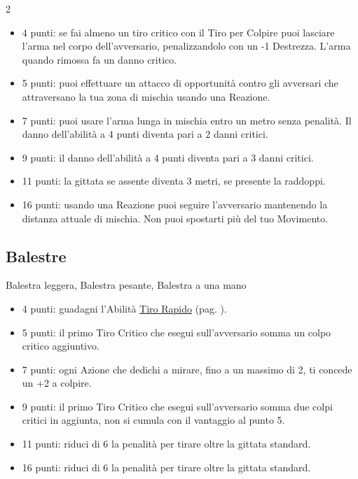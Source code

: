 \begin{multicols}{2}
\begin{itemize}[leftmargin=*]
\item 4 punti: se fai almeno un tiro critico con il Tiro per Colpire puoi lasciare l'arma nel corpo dell'avversario, penalizzandolo con un -1 Destrezza. L'arma quando rimossa fa un danno critico.
\item 5 punti: puoi effettuare un attacco di opportunità contro gli avversari che attraversano la tua zona di mischia usando una Reazione.
\item 7 punti: puoi usare l'arma lunga in mischia entro un metro senza penalità. Il danno dell'abilità a 4 punti diventa pari a 2 danni critici.
\item 9 punti: il danno dell'abilità a 4 punti diventa pari a 3 danni critici.
\item 11 punti: la gittata se assente diventa 3 metri, se presente la raddoppi.
\item 16 punti: usando una Reazione puoi seguire l'avversario mantenendo la distanza attuale di mischia. Non puoi spostarti più del tuo Movimento.

\end{itemize}

\subsection{Balestre}Balestra leggera, Balestra pesante, Balestra a una mano\label{listaarmibalestr}

\begin{itemize}[leftmargin=*] \setlength{\itemsep}{0pt}

\item 4 punti: guadagni l'Abilità \hyperlink{Tiro Rapido}{Tiro Rapido} (pag. \pageref{Tiro Rapido}).
\item 5 punti: il primo Tiro Critico che esegui sull'avversario somma un colpo critico aggiuntivo.
\item 7 punti: ogni Azione che dedichi a mirare, fino a un massimo di 2, ti concede un +2 a colpire.
\item 9 punti: il primo Tiro Critico che esegui sull'avversario somma due colpi critici in aggiunta, non si cumula con il vantaggio al punto 5.
\item 11 punti: riduci di 6 la penalità per tirare oltre la gittata standard.
\item 16 punti: riduci di 6 la penalità per tirare oltre la gittata standard.

\end{itemize}



\end{multicols}
